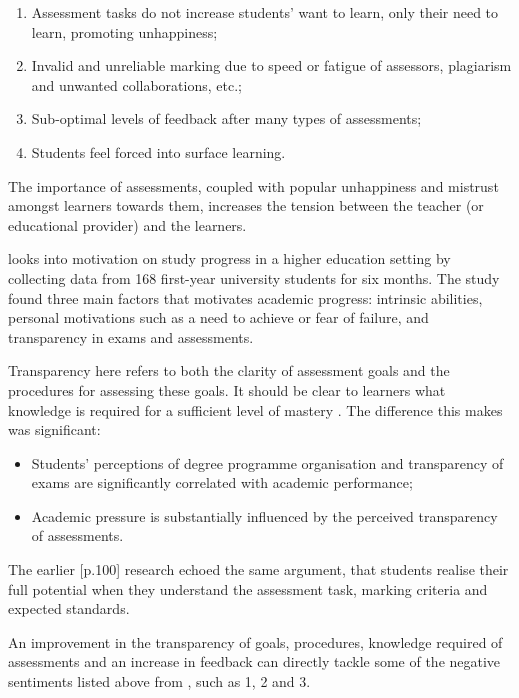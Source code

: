 \begin{enumerate}
    \setlength\itemsep{0em}
    \item Assessment tasks do not increase students' want to learn, only their need to learn, promoting unhappiness;
    \item Invalid and unreliable marking due to speed or fatigue of assessors, plagiarism and unwanted collaborations, etc.;
    \item Sub-optimal levels of feedback after many types of assessments;
    \item Students feel forced into surface learning.\\
    \citep[p.62-65]{brown1999assessment}
\end{enumerate}

The importance of assessments, coupled with popular unhappiness and mistrust amongst learners towards 
them, increases the tension between the teacher (or educational provider) and the learners.

\citet{suhre2013determinants} looks into motivation on study progress in a higher education setting by collecting data 
from 168 first-year university students for six months. The study found three main factors that motivates academic 
progress: intrinsic abilities, personal motivations such as a need to achieve or fear of failure, and transparency in 
exams and assessments.

Transparency here refers to both the clarity of assessment goals and the procedures for assessing these goals. 
It should be clear to learners what knowledge is required for a sufficient level of mastery \citep{suhre2013determinants}.
The difference this makes was significant:

\begin{itemize}
    \setlength\itemsep{0em}    
  \item Students' perceptions of degree programme organisation and transparency of exams are 
  significantly correlated with academic performance;
  \item Academic pressure is substantially influenced by the perceived transparency of assessments.
\end{itemize}

The earlier [p.100]\citet{bryan2006innovative} research echoed the same argument, that students realise their full potential 
when they understand the assessment task, marking criteria and expected standards.

An improvement in the transparency of goals, procedures, knowledge required of assessments and an increase 
in feedback can directly tackle some of the negative sentiments listed above from \citet{brown1999assessment}, 
such as 1, 2 and 3.

